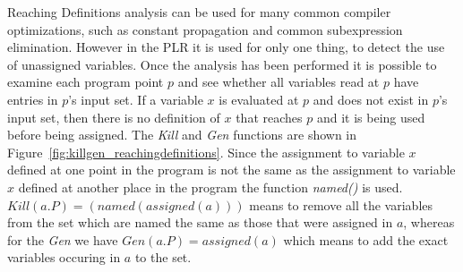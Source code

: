 	Reaching Definitions analysis can be used for many common compiler 
	optimizations, such as constant propagation and common subexpression 
	elimination. However in the PLR it is used for only one thing, to detect the 
	use of unassigned variables. Once the analysis has been performed it is 
	possible to examine each program point $p$ and see whether all variables
	read at $p$ have entries in $p$'s input set. If a variable $x$ is evaluated
	at $p$ and does not exist in $p$'s input set, then there is no definition
	of $x$ that reaches $p$ and it is being used before being assigned. The 
	\textit{Kill} and \textit{Gen} functions are shown in 
	Figure~\ref{fig:killgen_reachingdefinitions}. Since the assignment to variable 
	$x$ defined at one point in the program is not the same as the assignment 
	to variable $x$ defined at another place in the program the function 
	\textit{named()} is used. ${Kill(a.P) = (named(assigned(a)))}$ means to
	remove all the variables from the set which are named the same as those that
	were assigned in $a$, whereas for the \textit{Gen} we have 
	$Gen(a.P) = assigned(a)$ which means to add the exact variables occuring in
	$a$ to the set. 
	
